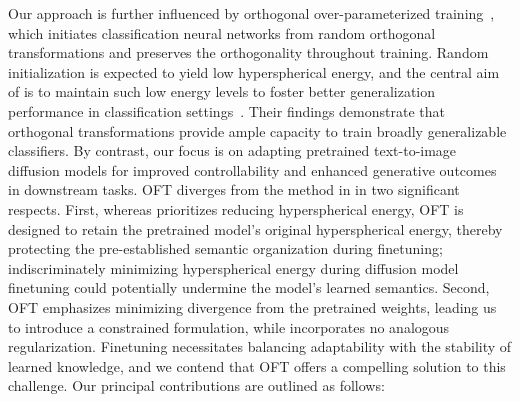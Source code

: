 Our approach is further influenced by orthogonal over-parameterized training~\cite{liu2021orthogonal}, which initiates classification neural networks from random orthogonal transformations and preserves the orthogonality throughout training. Random initialization is expected to yield low hyperspherical energy, and the central aim of \cite{liu2021orthogonal} is to maintain such low energy levels to foster better generalization performance in classification settings~\cite{liu2018learning,lin2020regularizing}. Their findings demonstrate that orthogonal transformations provide ample capacity to train broadly generalizable classifiers. By contrast, our focus is on adapting pretrained text-to-image diffusion models for improved controllability and enhanced generative outcomes in downstream tasks. OFT diverges from the method in \cite{liu2021orthogonal} in two significant respects. First, whereas \cite{liu2021orthogonal} prioritizes reducing hyperspherical energy, OFT is designed to retain the pretrained model’s original hyperspherical energy, thereby protecting the pre-established semantic organization during finetuning; indiscriminately minimizing hyperspherical energy during diffusion model finetuning could potentially undermine the model’s learned semantics. Second, OFT emphasizes minimizing divergence from the pretrained weights, leading us to introduce a constrained formulation, while \cite{liu2021orthogonal} incorporates no analogous regularization. Finetuning necessitates balancing adaptability with the stability of learned knowledge, and we contend that OFT offers a compelling solution to this challenge. Our principal contributions are outlined as follows:

